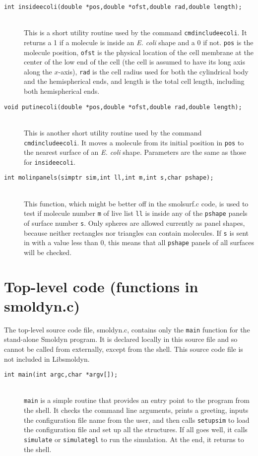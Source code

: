 \documentclass {book}
\begin{document}
\begin{description}
\item[\texttt{int insideecoli(double *pos,double *ofst,double rad,double length);}]
\hfill \\
This is a short utility routine used by the command \texttt{cmdincludeecoli}.  It returns a 1 if a molecule is inside an \emph{E. coli} shape and a 0 if not.  \texttt{pos} is the molecule position, \texttt{ofst} is the physical location of the cell membrane at the center of the low end of the cell (the cell is assumed to have its long axis along the $x$-axis), \texttt{rad} is the cell radius used for both the cylindrical body and the hemispherical ends, and length is the total cell length, including both hemispherical ends.

\item[\texttt{void putinecoli(double *pos,double *ofst,double rad,double length);}]
\hfill \\
This is another short utility routine used by the command \texttt{cmdincludeecoli}.  It moves a molecule from its initial position in \texttt{pos} to the nearest surface of an \emph{E. coli} shape.  Parameters are the same as those for \texttt{insideecoli}.

\item[\texttt{int molinpanels(simptr sim,int ll,int m,int s,char pshape);}]
\hfill \\
This function, which might be better off in the smolsurf.c code, is used to test if molecule number \texttt{m} of live list \texttt{ll} is inside any of the \texttt{pshape} panels of surface number \texttt{s}.  Only spheres are allowed currently as panel shapes, because neither rectangles nor triangles can contain molecules.  If \texttt{s} is sent in with a value less than 0, this means that all \texttt{pshape} panels of all surfaces will be checked.

\end{description}

\section{Top-level code (functions in smoldyn.c)}

The top-level source code file, smoldyn.c, contains only the \texttt{main} function for the stand-alone Smoldyn program.  It is declared locally in this source file and so cannot be called from externally, except from the shell.  This source code file is not included in Libsmoldyn.

\begin{description}

\item[\texttt{int main(int argc,char *argv[]);}]
\hfill \\
\texttt{main} is a simple routine that provides an entry point to the program from the shell.  It checks the command line arguments, prints a greeting, inputs the configuration file name from the user, and then calls \texttt{setupsim} to load the configuration file and set up all the structures.  If all goes well, it calls \texttt{simulate} or \texttt{simulategl} to run the simulation.  At the end, it returns to the shell.

\end{description}
\end{document}

